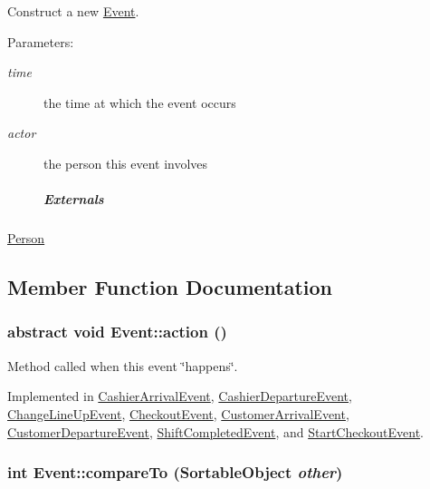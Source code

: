 Construct a new \hyperlink{class_event}{Event}. 

\begin{Desc}
\item[Parameters:]
\begin{description}
\item[{\em time}]the time at which the event occurs \item[{\em actor}]the person this event involves \subparagraph*{Externals}\end{description}
\end{Desc}
\hyperlink{class_person}{Person} 

\subsection{Member Function Documentation}
\hypertarget{class_event_fea360b9a95713e43cf3f9fa44150074}{
\subsubsection[{action}]{\setlength{\rightskip}{0pt plus 5cm}abstract void Event::action ()}}
\label{class_event_fea360b9a95713e43cf3f9fa44150074}


Method called when this event \char`\"{}happens\char`\"{}. 



Implemented in \hyperlink{class_cashier_arrival_event_f3bf40e4e3915f54eb9a24ac816ed0cb}{CashierArrivalEvent}, \hyperlink{class_cashier_departure_event_58a6e618df64f71ef309786ef8a9488f}{CashierDepartureEvent}, \hyperlink{class_change_line_up_event_e7a0c51e7d5fd3e2e126381045f22683}{ChangeLineUpEvent}, \hyperlink{class_checkout_event_cd029a04de786e0d128b3f4220724d4f}{CheckoutEvent}, \hyperlink{class_customer_arrival_event_70898c7fa4f92abf462e03b1cd76756b}{CustomerArrivalEvent}, \hyperlink{class_customer_departure_event_0245be14abc9118d39123158559e1cdb}{CustomerDepartureEvent}, \hyperlink{class_shift_completed_event_4b09c21b802da89066245fbfc0111049}{ShiftCompletedEvent}, and \hyperlink{class_start_checkout_event_84fa31ea480e52721e62eee452d87e0e}{StartCheckoutEvent}.\hypertarget{class_event_6ef202b20715ab70bcfc052e64f1094b}{
\subsubsection[{compareTo}]{\setlength{\rightskip}{0pt plus 5cm}int Event::compareTo ({\bf SortableObject} {\em other})}}
\label{class_event_6ef202b20715ab70bcfc052e64f1094b}


